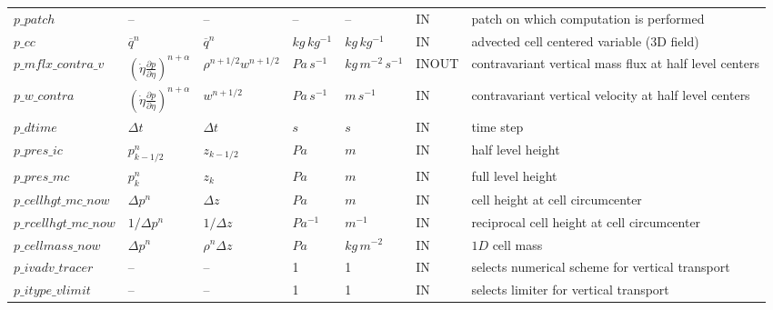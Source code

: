 \begin{landscape}
\begin{singlespacing}
\begin{longtable}{p{2.9cm}|x{2.9cm}|x{2.9cm}|x{1.9cm}|x{1.9cm}|x{1.7cm}|p{7.3cm}}
$p\_patch$             &  --                              &  --                          &  --                 &  --                    &  IN        &  patch on which computation is performed\\
$p\_cc$                &  $\overline{q}^{n}$              &  $\overline{q}^{n}$          &  $kg\,kg^{-1}$      &  $kg\,kg^{-1}$         &  IN        &  advected cell centered variable (3D field)\\
$p\_mflx\_contra\_v$   &  $(\dot{\eta}\frac{\partial p}{\partial \eta})^{n+\alpha}$&  $\rho^{n+1/2}w^{n+1/2}$&  $Pa\,s^{-1}$&  $kg\,m^{-2}\,s^{-1}$&  INOUT &  contravariant vertical mass flux at half level centers\\
$p\_w\_contra$         &  $(\dot{\eta}\frac{\partial p}{\partial \eta})^{n+\alpha}$&  $w^{n+1/2}$&  $Pa\,s^{-1}$&  $m\,s^{-1}$          &  IN        &  contravariant vertical velocity at half level centers\\
$p\_dtime$             &  $\Delta t$                      &  $\Delta t$                  &  $s$                &  $s$                   &  IN        &  time step\\
$p\_pres\_ic$          &  $p^{n}_{k-1/2}$                 &  $z_{k-1/2}$                 &  $Pa$               &  $m$                   &  IN        &  half level height\\
$p\_pres\_mc$          &  $p^{n}_{k}$                     &  $z_{k}$                     &  $Pa$               &  $m$                   &  IN        &  full level height\\
$p\_cellhgt\_mc\_now$  &  $\Delta p^{n}$                  &  $\Delta z$                  &   $Pa$              &  $m$                   &  IN        &  cell height at cell circumcenter\\
$p\_rcellhgt\_mc\_now$ &  $1/\Delta p^{n}$                &  $1/\Delta z$                &   $Pa^{-1}$         &  $m^{-1}$              &  IN        &  reciprocal cell height at cell circumcenter\\
$p\_cellmass\_now$     &  $\Delta p^{n}$                  &  $\rho^{n}\Delta z$          &   $Pa$              &  $kg\,m^{-2}$          &  IN        &  $1D$ cell mass\\
$p\_ivadv\_tracer$     &  --                              &  --                          &   1                 &  1                     &  IN        &  selects numerical scheme for vertical transport\\
$p\_itype\_vlimit$     &  --                              &  --                          &   1                 &  1                     &  IN        &  selects limiter for vertical transport \\

\end{longtable}
\end{singlespacing}
\end{landscape}
